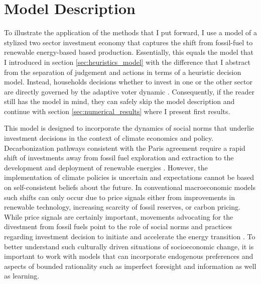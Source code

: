 \section{Model Description}
\label{sec:approx_Model_Description}

To illustrate the application of the methods that I put forward, I use a model of a stylized two sector investment economy that captures the shift from fossil-fuel to renewable energy-based based production. Essentially, this equals the model that I introduced in section \ref{sec:heuristics_model} with the difference that I abstract from the separation of judgement and actions in terms of a heuristic decision model. Instead, households decisions whether to invest in one or the other sector are directly governed by the adaptive voter dynamic \citep{Holme2006a}.
Consequently, if the reader still has the model in mind, they can safely skip the model description and continue with section \ref{sec:numerical_results} where I present first results.

This model is designed to incorporate the dynamics of social norms that underlie investment decisions in the context of climate economics and policy. Decarbonization pathways consistent with the Paris agreement require a rapid shift of investments away from fossil fuel exploration and extraction to the development and deployment of renewable energies \citep{IPCC2014}. However, the implementation of climate policies is uncertain and expectations cannot be based on self-consistent beliefs about the future.  In conventional macroeconomic models such shifts can only occur due to price signals either from improvements in renewable technology, increasing scarcity of fossil reserves, or carbon pricing. While price signals are certainly important, movements advocating for the divestment from fossil fuels point to the role of social norms and practices regarding investment decision to initiate and accelerate the energy transition \citep{Ans2013,Nyborg2016}. To better understand such culturally driven situations of socioeconomic change, it is important to work with models that can incorporate endogenous preferences and aspects of bounded rationality such as imperfect foresight and information as well as learning.
\label{sec:approx_economy}

